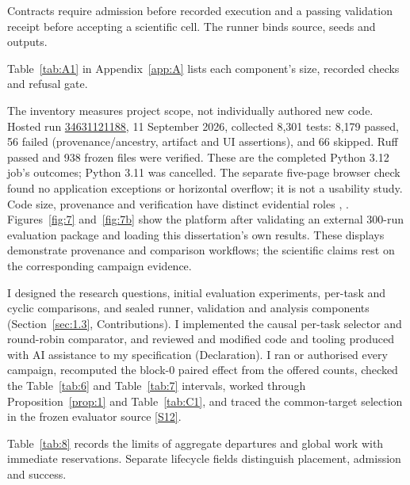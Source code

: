 \documentclass[12pt,a4paper]{article}
\begin{document}
Contracts require admission before recorded execution and a passing validation receipt before accepting a scientific cell. The runner binds source, seeds and outputs.

Table~\ref{tab:A1} in Appendix~\ref{app:A} lists each component's size, recorded checks and refusal gate.

The inventory measures project scope, not individually authored new code. Hosted run \href{\detokenize{https://github.com/Abdulla4akash/traffictwin/actions/runs/34631121188}}{34631121188}, 11 September 2026, collected 8,301 tests: 8,179 passed, 56 failed (provenance/ancestry, artifact and UI assertions), and 66 skipped. Ruff passed and 938 frozen files were verified. These are the completed Python 3.12 job's outcomes; Python 3.11 was cancelled. The separate five-page browser check found no application exceptions or horizontal overflow; it is not a usability study. Code size, provenance and verification have distinct evidential roles \cite{ref37}, \cite{ref38}. Figures~\ref{fig:7} and~\ref{fig:7b} show the platform after validating an external 300-run evaluation package and loading this dissertation's own results. These displays demonstrate provenance and comparison workflows; the scientific claims rest on the corresponding campaign evidence.


I designed the research questions, initial evaluation experiments, per-task and cyclic comparisons, and sealed runner, validation and analysis components (Section~\ref{sec:1.3}, Contributions). I implemented the causal per-task selector and round-robin comparator, and reviewed and modified code and tooling produced with AI assistance to my specification (Declaration). I ran or authorised every campaign, recomputed the block-0 paired effect from the offered counts, checked the Table~\ref{tab:6} and Table~\ref{tab:7} intervals, worked through Proposition~\ref{prop:1} and Table~\ref{tab:C1}, and traced the common-target selection in the frozen evaluator source \hyperref[source-s12]{[S12]}.

Table~\ref{tab:8} records the limits of aggregate departures and global work with immediate reservations. Separate lifecycle fields distinguish placement, admission and success.
\end{document}
